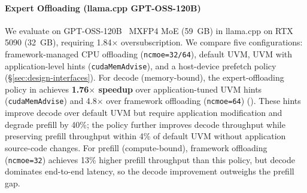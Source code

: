 \paragraph{Expert Offloading (llama.cpp GPT-OSS-120B)}
We evaluate \sys on GPT-OSS-120B~\cite{openai2025gptoss} MXFP4 MoE (59~GB) in llama.cpp on RTX 5090 (32~GB), requiring 1.84$\times$ oversubscription.
We compare five configurations: framework-managed CPU offloading (\texttt{ncmoe=\allowbreak{}32/64}), default UVM, UVM with application-level hints (\texttt{cuda\-Mem\-Advise}), and a \sys{} host-device prefetch policy (\S\ref{sec:design-interfaces}).
For decode (memory-bound), the expert-offloading policy in \sys{} achieves \textbf{1.76$\times$ speedup} over application-tuned UVM hints (\texttt{cuda\-Mem\-Advise}) and 4.8$\times$ over framework offloading (\texttt{ncmoe=64}) ().
These hints improve decode over default UVM but require application modification and degrade prefill by 40\%; the \sys{} policy further improves decode throughput while preserving prefill throughput within 4\% of default UVM without application source-code changes.
For prefill (compute-bound), framework offloading (\texttt{ncmoe=32}) achieves 13\% higher prefill throughput than this policy, but decode dominates end-to-end latency, so the decode improvement outweighs the prefill gap.%

